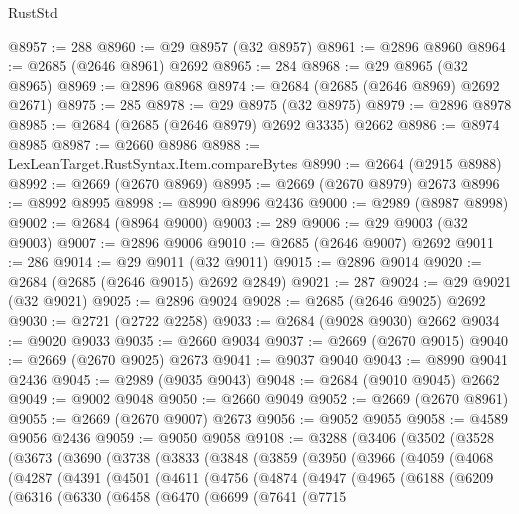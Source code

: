 \begin{lexlean}{RustStd}
\begin{coremodule}
@8957 := 288
@8960 := @29 @8957 (@32 @8957)
@8961 := @2896 @8960
@8964 := @2685 (@2646 @8961) @2692
@8965 := 284
@8968 := @29 @8965 (@32 @8965)
@8969 := @2896 @8968
@8974 := @2684 (@2685 (@2646 @8969) @2692 @2671)
@8975 := 285
@8978 := @29 @8975 (@32 @8975)
@8979 := @2896 @8978
@8985 := @2684 (@2685 (@2646 @8979) @2692 @3335) @2662
@8986 := @8974 @8985
@8987 := @2660 @8986
@8988 := LexLeanTarget.RustSyntax.Item.compareBytes
@8990 := @2664 (@2915 @8988)
@8992 := @2669 (@2670 @8969)
@8995 := @2669 (@2670 @8979) @2673
@8996 := @8992 @8995
@8998 := @8990 @8996 @2436
@9000 := @2989 (@8987 @8998)
@9002 := @2684 (@8964 @9000)
@9003 := 289
@9006 := @29 @9003 (@32 @9003)
@9007 := @2896 @9006
@9010 := @2685 (@2646 @9007) @2692
@9011 := 286
@9014 := @29 @9011 (@32 @9011)
@9015 := @2896 @9014
@9020 := @2684 (@2685 (@2646 @9015) @2692 @2849)
@9021 := 287
@9024 := @29 @9021 (@32 @9021)
@9025 := @2896 @9024
@9028 := @2685 (@2646 @9025) @2692
@9030 := @2721 (@2722 @2258)
@9033 := @2684 (@9028 @9030) @2662
@9034 := @9020 @9033
@9035 := @2660 @9034
@9037 := @2669 (@2670 @9015)
@9040 := @2669 (@2670 @9025) @2673
@9041 := @9037 @9040
@9043 := @8990 @9041 @2436
@9045 := @2989 (@9035 @9043)
@9048 := @2684 (@9010 @9045) @2662
@9049 := @9002 @9048
@9050 := @2660 @9049
@9052 := @2669 (@2670 @8961)
@9055 := @2669 (@2670 @9007) @2673
@9056 := @9052 @9055
@9058 := @4589 @9056 @2436
@9059 := @9050 @9058
@9108 := @3288
    (@3406
      (@3502
        (@3528
          (@3673
            (@3690
              (@3738
                (@3833
                  (@3848
                    (@3859
                      (@3950
                        (@3966
                          (@4059
                            (@4068
                              (@4287
                                (@4391
                                  (@4501
                                    (@4611
                                      (@4756
                                        (@4874
                                          (@4947
                                            (@4965
                                              (@6188
                                                (@6209
                                                  (@6316
                                                    (@6330
                                                      (@6458
                                                        (@6470
                                                          (@6699
                                                            (@7641
                                                              (@7715

\end{coremodule}
\end{lexlean}
